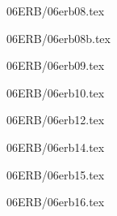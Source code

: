 \documentclass[9pt, xcolor={svgnames, x11names},professionalfonts]{beamer}
\def\scale{1}
\begin{document}

\begin{frame}{06ERB/06erb08.tex}	
		\def\scale{0.75}
		
\end{frame}


\begin{frame}{06ERB/06erb08b.tex}	
		\def\scale{0.75}
		
\end{frame}


\begin{frame}{06ERB/06erb09.tex}	
		\def\scale{0.625}
		\tcb{
			
		}		
\end{frame}


\begin{frame}{06ERB/06erb10.tex}	
		\def\scale{0.625}
		
\end{frame}


\begin{frame}{06ERB/06erb12.tex}	
		\def\scale{0.625}
		
\end{frame}


\begin{frame}{06ERB/06erb14.tex}	
	\def\scale{0.55}
	
\end{frame}

\begin{frame}{06ERB/06erb15.tex}	
	\def\scale{0.75}
	
\end{frame}


\begin{frame}{06ERB/06erb16.tex}	
	\def\scale{1}
	
\end{frame}
\end{document}
